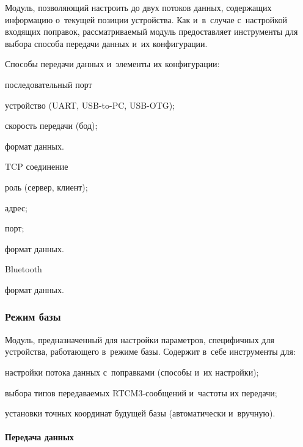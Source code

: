 Модуль, позволяющий настроить до двух потоков данных, содержащих информацию о~текущей позиции устройства. Как и~в~случае с~настройкой входящих поправок, рассматриваемый модуль предоставляет инструменты для выбора способа передачи данных и~их конфигурации.

Способы передачи данных и~элементы их конфигурации:
\begin{dashitemize}
  \item последовательный порт
  \begin{dashitemize}
    \item устройство (UART, USB-to-PC, USB-OTG);
    \item скорость передачи (бод);
    \item формат данных.
  \end{dashitemize}

  \item TCP соединение
  \begin{dashitemize}
    \item роль (сервер, клиент);
    \item адрес;
    \item порт;
    \item формат данных.
  \end{dashitemize}

  \item Bluetooth
  \begin{dashitemize}
    \item формат данных.
  \end{dashitemize}
\end{dashitemize}


\subsubsection{Режим базы}

Модуль, предназначенный для настройки параметров, специфичных для устройства, работающего в~режиме базы. Содержит в~себе инструменты для:
\begin{dashitemize}
  \item настройки потока данных с~поправками (способы и~их настройки);
  \item выбора типов передаваемых RTCM3-сообщений и~частоты их передачи;
  \item установки точных координат будущей базы (автоматически и~вручную).
\end{dashitemize}

\paragraph{Передача данных}



